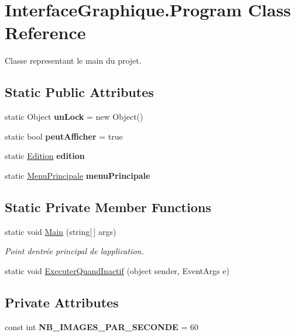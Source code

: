 \hypertarget{class_interface_graphique_1_1_program}{}\section{Interface\+Graphique.\+Program Class Reference}
\label{class_interface_graphique_1_1_program}


Classe representant le main du projet.  


\subsection*{Static Public Attributes}
\begin{DoxyCompactItemize}
\item 
static Object {\bfseries un\+Lock} = new Object()
\item 
static bool {\bfseries peut\+Afficher} = true
\item 
static \hyperlink{class_interface_graphique_1_1_edition}{Edition} {\bfseries edition}
\item 
static \hyperlink{class_interface_graphique_1_1_menu_principale}{Menu\+Principale} {\bfseries menu\+Principale}
\end{DoxyCompactItemize}
\subsection*{Static Private Member Functions}
\begin{DoxyCompactItemize}
\item 
static void \hyperlink{group__inf2990_ga9aeb8768ad67ed21f795d6eee48c47a9}{Main} (string\mbox{[}$\,$\mbox{]} args)
\begin{DoxyCompactList}\small\item\em Point d\textquotesingle{}entrée principal de l\textquotesingle{}application. \end{DoxyCompactList}\item 
static void \hyperlink{group__inf2990_gaf51bcc84fd402db8d6f77143690fa443}{Executer\+Quand\+Inactif} (object sender, Event\+Args e)
\end{DoxyCompactItemize}
\subsection*{Private Attributes}
\begin{DoxyCompactItemize}
\item 
const int {\bfseries N\+B\+\_\+\+I\+M\+A\+G\+E\+S\+\_\+\+P\+A\+R\+\_\+\+S\+E\+C\+O\+N\+DE} = 60
\end{DoxyCompactItemize}
